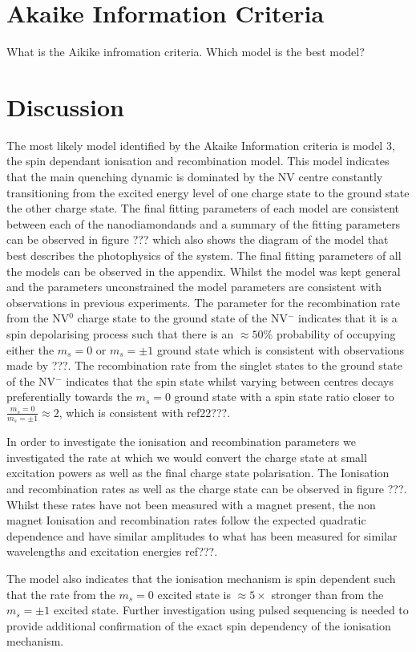 \documentclass[,prl,twocolumn]{revtex4}
\begin{document}
\section{Akaike Information Criteria}
What is the Aikike infromation criteria.
Which model is the best model?

\section{Discussion}
The most likely model identified by the Akaike Information criteria is model 3, the spin dependant ionisation and recombination model. This model indicates that the main quenching dynamic is dominated by the NV centre constantly transitioning from the excited energy level of one charge state to the ground state the other charge state. The final fitting parameters of each model are consistent between each of the nanodiamondands and a summary of the fitting parameters can be observed in figure ??? which also shows the diagram of the model that best describes the photophysics of the system. The final fitting parameters of all the models can be observed in the appendix. Whilst the model was kept general and the parameters unconstrained the model parameters are consistent with observations in previous experiments. The parameter for the recombination rate from the NV$^0$ charge state to the ground state of the NV$^-$ indicates that it is a spin depolarising process such that there is an $\approx 50\%$ probability of occupying either the $m_s = 0$ or $m_s=\pm1$ ground state which is consistent with observations made by ???. The recombination rate from the singlet states to the ground state of the NV$^-$ indicates that the spin state whilst varying between centres decays preferentially towards the $m_s=0$ ground state with a spin state ratio closer to $\frac{m_s=0}{m_s=\pm1} \approx 2$, which is consistent with ref22???. 

In order to investigate the ionisation and recombination parameters we investigated the rate at which we would convert the charge state at small excitation powers as well as the final charge state polarisation. The Ionisation and recombination rates as well as the charge state can be observed in figure ???. Whilst these rates have not been measured with a magnet present, the non magnet Ionisation and recombination rates follow the expected quadratic dependence and have similar amplitudes to what has been measured for similar wavelengths and excitation energies ref???. 

The model also indicates that the ionisation mechanism is spin dependent such that the rate from the $m_s=0$ excited state is $\approx 5\times$ stronger than from the $m_s=\pm1$ excited state. Further investigation using pulsed sequencing is needed to provide additional confirmation of the exact spin dependency of the ionisation mechanism.
 
\end{document}
